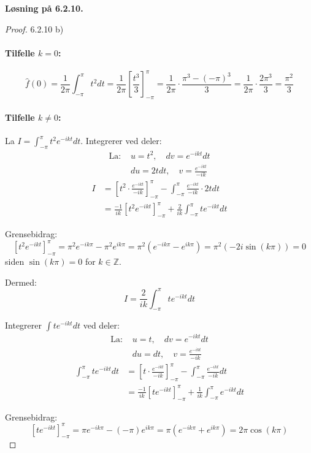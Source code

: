 \documentclass[a4paper,norsk]{article}
\newenvironment{oppgave}[1]%
	{\trivlist{}\item\relax\textbf{Løsning på #1.}\medspace}%
	{\endtrivlist}
\begin{document}
\begin{oppgave}{6.2.10}
\begin{proof}{6.2.10 b)}
\paragraph{Tilfelle $k = 0$:}
\[
\hat{f}(0) = \frac{1}{2\pi} \int_{-\pi}^{\pi} t^2  dt 
= \frac{1}{2\pi} \left[ \frac{t^3}{3} \right]_{-\pi}^{\pi}
= \frac{1}{2\pi} \cdot \frac{\pi^3 - (-\pi)^3}{3}
= \frac{1}{2\pi} \cdot \frac{2\pi^3}{3}
= \frac{\pi^2}{3}
\]

\paragraph{Tilfelle $k \neq 0$:}
La $I = \int_{-\pi}^{\pi} t^2 e^{-ikt}  dt$. Integrerer ved deler:
\begin{align*}
\text{La: } & u = t^2, \quad dv = e^{-ikt}dt \\
& du = 2tdt, \quad v = \frac{e^{-ikt}}{-ik}
\end{align*}
\begin{align*}
I &= \left[ t^2 \cdot \frac{e^{-ikt}}{-ik} \right]_{-\pi}^{\pi} 
   - \int_{-\pi}^{\pi} \frac{e^{-ikt}}{-ik} \cdot 2t  dt \\
&= \frac{-1}{ik} \left[ t^2 e^{-ikt} \right]_{-\pi}^{\pi} 
   + \frac{2}{ik} \int_{-\pi}^{\pi} t e^{-ikt}  dt
\end{align*}

Grensebidrag:
\[
\left[ t^2 e^{-ikt} \right]_{-\pi}^{\pi} = \pi^2 e^{-ik\pi} - \pi^2 e^{ik\pi} 
= \pi^2(e^{-ik\pi} - e^{ik\pi}) = \pi^2(-2i\sin(k\pi)) = 0
\]
siden $\sin(k\pi) = 0$ for $k \in \mathbb{Z}$.

Dermed:
\[
I = \frac{2}{ik} \int_{-\pi}^{\pi} t e^{-ikt}  dt
\]

Integrerer $\int t e^{-ikt}  dt$ ved deler:
\begin{align*}
\text{La: } & u = t, \quad dv = e^{-ikt}dt \\
& du = dt, \quad v = \frac{e^{-ikt}}{-ik}
\end{align*}
\begin{align*}
\int_{-\pi}^{\pi} t e^{-ikt}  dt &= \left[ t \cdot \frac{e^{-ikt}}{-ik} \right]_{-\pi}^{\pi} 
- \int_{-\pi}^{\pi} \frac{e^{-ikt}}{-ik}  dt \\
&= \frac{-1}{ik} \left[ t e^{-ikt} \right]_{-\pi}^{\pi} 
+ \frac{1}{ik} \int_{-\pi}^{\pi} e^{-ikt}  dt
\end{align*}

Grensebidrag:
\[
\left[ t e^{-ikt} \right]_{-\pi}^{\pi} = \pi e^{-ik\pi} - (-\pi)e^{ik\pi} 
= \pi(e^{-ik\pi} + e^{ik\pi}) = 2\pi\cos(k\pi)
\]


\end{proof}
\end{oppgave}
\end{document}
